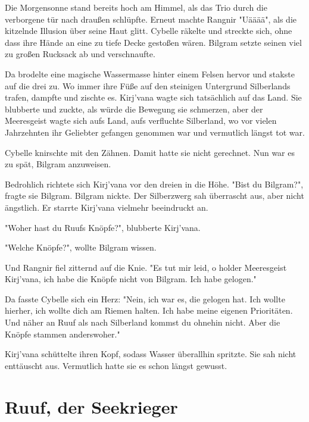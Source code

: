 Die Morgensonne stand bereits hoch am Himmel, als das Trio durch die verborgene tür nach draußen schlüpfte. Erneut machte Rangnir "Uääää", als die kitzelnde Illusion über seine Haut glitt. Cybelle räkelte und streckte sich, ohne dass ihre Hände an eine zu tiefe Decke gestoßen wären. Bilgram setzte seinen viel zu großen Rucksack ab und verschnaufte.

Da brodelte eine magische Wassermasse hinter einem Felsen hervor und stakste auf die drei zu. Wo immer ihre Füße auf den steinigen Untergrund Silberlands trafen, dampfte und zischte es. Kirj'vana wagte sich tatsächlich auf das Land. Sie blubberte und zuckte, als würde die Bewegung sie schmerzen, aber der Meeresgeist wagte sich aufs Land, aufs verfluchte Silberland, wo vor vielen Jahrzehnten ihr Geliebter gefangen genommen war und vermutlich längst tot war.

Cybelle knirschte mit den Zähnen. Damit hatte sie nicht gerechnet. Nun war es zu spät, Bilgram anzuweisen.

Bedrohlich richtete sich Kirj'vana vor den dreien in die Höhe. "Bist du Bilgram?", fragte sie Bilgram. Bilgram nickte. Der Silberzwerg sah überrascht aus, aber nicht ängstlich. Er starrte Kirj'vana vielmehr beeindruckt an.

"Woher hast du Ruufs Knöpfe?", blubberte Kirj'vana.

"Welche Knöpfe?", wollte Bilgram wissen.

Und Rangnir fiel zitternd auf die Knie. "Es tut mir leid, o holder Meeresgeist Kirj'vana, ich habe die Knöpfe nicht von Bilgram. Ich habe gelogen."

Da fasste Cybelle sich ein Herz: "Nein, ich war es, die gelogen hat. Ich wollte hierher, ich wollte dich am Riemen halten. Ich habe meine eigenen Prioritäten. Und näher an Ruuf als nach Silberland kommst du ohnehin nicht. Aber die Knöpfe stammen anderswoher."

Kirj'vana schüttelte ihren Kopf, sodass Wasser überallhin spritzte. Sie sah nicht enttäuscht aus. Vermutlich hatte sie es schon längst gewusst.










\newpage
\section{Ruuf, der Seekrieger}




















